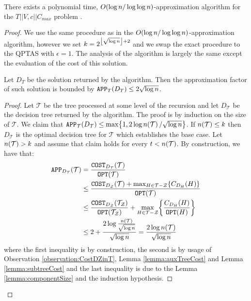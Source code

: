 \begin{theorem}
    There exists a polynomial time, $O\mathopen{}\left( \log n/\log\log n \right)$-approximation algorithm for the $T||V,c||C_{max}$ problem .
    \begin{proof}
    We use the same procedure as in the $O\mathopen{}\left( \log n/\log\log n \right)$-approximation algorithm, however we set $k=2^{\mathopen{}\left\lfloor \sqrt{\log n} \right\rfloor+2}$ and we swap the exact procedure to the QPTAS with $\epsilon=1$. The analysis of the algorithm is largely the same except the evaluation of the cost of this solution.
    \begin{lemma}
        Let $D_T$ be the solution returned by the algorithm. Then the approximation factor of such solution is bounded by 
    $
    \texttt{APP}_T\mathopen{}\left( D_T \right)\leq 2\sqrt{\log n}
    $.
    \begin{proof}
        Let $\mathcal{T}$ be the tree processed at some level of the recursion and let $D_{\mathcal{T}}$ be the decision tree returned by the algorithm. The proof is by induction on the size of $\mathcal{T}$.  We claim that $\texttt{APP}_{\mathcal{T}}\mathopen{}\left( D_{\mathcal{T}} \right)\leq \max\mathopen{}\left\{ 1, 2\log n\mathopen{}\left( \mathcal{T} \right)/\sqrt{\log n} \right\}$. If $n\mathopen{}\left( \mathcal{T} \right)\leq k$ then $D_{\mathcal{T}}$ is the optimal decision tree for $\mathcal{T}$ which establishes the base case. Let $n\mathopen{}\left( \mathcal{T} \right) > k$ and assume that claim holds for every $t< n\mathopen{}\left( \mathcal{T} \right)$. 
        By construction, we have that:
        \begin{align*}
        \texttt{APP}_{D_{\mathcal{T}}}\mathopen{}\left( \mathcal{T} \right)&=\frac{\texttt{COST}_{D_{\mathcal{T}}}\mathopen{}\left( \mathcal{T} \right)}{\texttt{OPT}\mathopen{}\left( \mathcal{T} \right)}\\
        &\leq \frac{\texttt{COST}_{D_{\mathcal{Z}}}\mathopen{}\left( \mathcal{T} \right)+\max_{H\in \mathcal{T}-\mathcal{Z}}\mathopen{}\left\{ C_{D_H}\mathopen{}\left( H \right) \right\}}{\texttt{OPT}\mathopen{}\left( \mathcal{T} \right)}\\
        &\leq \frac{\texttt{COST}_{D_{\mathcal{Z}}}\mathopen{}\left( \mathcal{T}_{\mathcal{Z}} \right)}{\texttt{OPT}\mathopen{}\left( \mathcal{T}_{\mathcal{Z}} \right)}+\max_{H\in \mathcal{T}-\mathcal{Z}}\mathopen{}\left\{ \frac{C_{D_H}\mathopen{}\left( H \right)}{\texttt{OPT}\mathopen{}\left( H \right)} \right\}\\
        &\leq 2+\frac{2\log\frac{n\mathopen{}\left( \mathcal{T} \right)}{\sqrt{\log n}}}{\sqrt{\log n}}= \frac{2\log n\mathopen{}\left( \mathcal{T} \right)}{\sqrt{\log n}}
        \end{align*}
        where the first inequality is by construction, the second is by usage of Observation \ref{observation:CostDZinT}, Lemma \ref{lemma:auxTreeCost} and Lemma \ref{lemma:subtreeCost} and the last inequality is due to the Lemma \ref{lemma:componentSize} and the induction hypothesis.
    \end{proof}
\end{lemma}
    \end{proof}
\end{theorem}

